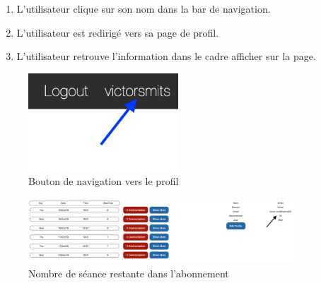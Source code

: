 \begin{enumerate}
	\item L'utilisateur clique sur son nom dans la bar de navigation.
	\item L'utilisateur est redirigé vers sa page de profil. 
	\item L'utilisateur retrouve l'information dans le cadre afficher sur la page.
\end{enumerate}

\vspace{\baselineskip}
\begin{figure}[h]
	\includegraphics[width=0.5\textwidth,center]{Figures/us7-1}
	\caption{Bouton de navigation vers le profil}
\end{figure}

\vspace{\baselineskip}
\begin{figure}[h]
	\includegraphics[width=0.9\textwidth,center]{Figures/us7-2}
	\caption{Nombre de séance restante dans l'abonnement}
\end{figure}


